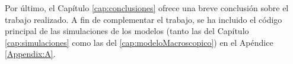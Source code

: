 Por último, el Capítulo \ref{cap:conclusiones} ofrece una breve conclusión sobre el trabajo realizado. A fin de complementar el trabajo, se ha incluido el código principal de las simulaciones de los modelos (tanto las del Capítulo \ref{cap:simulaciones} como las del \ref{cap:modeloMacroscopico}) en el Apéndice \ref{Appendix:A}.






